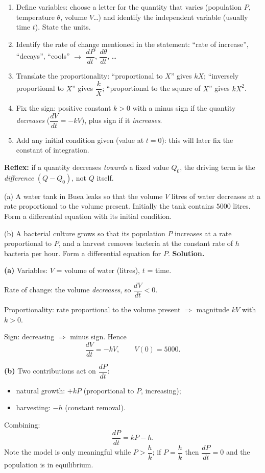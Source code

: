 \documentclass[11pt]{article}
\newcommand{\cle}[1]{{\popxbold\color{popdark}#1}}
\begin{document}
\begin{methode}
\begin{enumerate}
\item \cle{Define variables}: choose a letter for the quantity that varies (population $P$, temperature $\theta$, volume $V$\dots) and identify the independent variable (usually time $t$). State the units.
\item Identify the \cle{rate of change} mentioned in the statement: ``rate of increase'', ``decays'', ``cools'' $\rightarrow$ $\dfrac{dP}{dt}$, $\dfrac{d\theta}{dt}$, \dots
\item Translate the \cle{proportionality}: ``proportional to $X$'' gives $kX$; ``inversely proportional to $X$'' gives $\dfrac{k}{X}$; ``proportional to the square of $X$'' gives $kX^2$.
\item Fix the \cle{sign}: positive constant $k>0$ with a minus sign if the quantity \emph{decreases} ($\dfrac{dV}{dt}=-kV$), plus sign if it \emph{increases}.
\item Add any \cle{initial condition} given (value at $t=0$): this will later fix the constant of integration.
\end{enumerate}
\textbf{Reflex:} if a quantity decreases \emph{towards} a fixed value $Q_0$, the driving term is the \emph{difference} $(Q-Q_0)$, not $Q$ itself.
\end{methode}

\begin{exoresolu}
(a) A water tank in Buea leaks so that the volume $V$ litres of water decreases at a rate proportional to the volume present. Initially the tank contains $5000$ litres. Form a differential equation with its initial condition.

(b) A bacterial culture grows so that its population $P$ increases at a rate proportional to $P$, and a harvest removes bacteria at the constant rate of $h$ bacteria per hour. Form a differential equation for $P$.
\tcblower
\textbf{Solution.}

\textbf{(a)} Variables: $V$ = volume of water (litres), $t$ = time.

Rate of change: the volume \emph{decreases}, so $\dfrac{dV}{dt}<0$.

Proportionality: rate proportional to the volume present $\Rightarrow$ magnitude $kV$ with $k>0$.

Sign: decreasing $\Rightarrow$ minus sign. Hence
\[ \boxed{\frac{dV}{dt} = -kV, \qquad V(0) = 5000.} \]

\textbf{(b)} Two contributions act on $\dfrac{dP}{dt}$:
\begin{itemize}
\item natural growth: $+kP$ (proportional to $P$, increasing);
\item harvesting: $-h$ (constant removal).
\end{itemize}
Combining:
\[ \boxed{\frac{dP}{dt} = kP - h.} \]
Note the model is only meaningful while $P > \dfrac{h}{k}$; if $P = \dfrac{h}{k}$ then $\dfrac{dP}{dt}=0$ and the population is in equilibrium.
\end{exoresolu}
\end{document}
